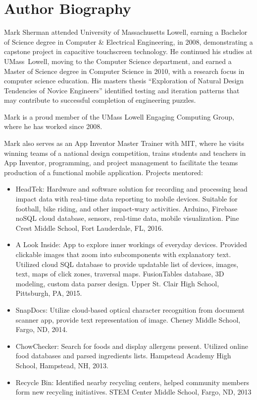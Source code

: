 \chapter{Author Biography}

Mark Sherman attended University of Massachusetts Lowell, earning a  Bachelor of Science degree in Computer \& Electrical Engineering, in 2008, demonstrating a capstone project in capacitive touchscreen technology. He continued his studies at UMass~Lowell, moving to the Computer Science department, and earned a Master of Science degree in Computer Science in 2010, with a research focus in computer science education. His masters thesis ``Exploration of Natural Design Tendencies of Novice Engineers'' identified testing and iteration patterns that may contribute to successful completion of engineering puzzles.

Mark is a proud member of the UMass Lowell Engaging Computing Group, where he has worked since 2008.

Mark also serves as an App Inventor Master Trainer with MIT, where he visits winning teams of a national design competition, trains students and teachers in App Inventor, programming, and project management to facilitate the teams production of a functional mobile application.
Projects mentored:
\begin{itemize}
\item HeadTek: Hardware and software solution for recording and processing head impact data with real-time data
reporting to mobile devices. Suitable for football, bike riding, and other impact-wary activities. Arduino, Firebase noSQL cloud database, sensors, real-time data, mobile visualization. Pine Crest Middle School, Fort Lauderdale, FL, 2016.
\item A Look Inside: App to explore inner workings of everyday devices. Provided clickable images that zoom into subcomponents with explanatory text. Utilized cloud SQL database to provide updatable list of devices, images, text, maps of click zones, traversal maps. FusionTables database, 3D modeling, custom data parser design. Upper St. Clair High School, Pittsburgh, PA, 2015.
\item SnapDocs: Utilize cloud-based optical character recognition from document scanner app, provide text representation of image. Cheney Middle School, Fargo, ND, 2014.
\item ChowChecker: Search for foods and display allergens present. Utilized online food databases and parsed ingredients lists. Hampstead Academy High School, Hampstead, NH, 2013.
\item Recycle Bin: Identified nearby recycling centers, helped community members form new recycling initiatives. STEM Center Middle School, Fargo, ND, 2013
\end{itemize}

